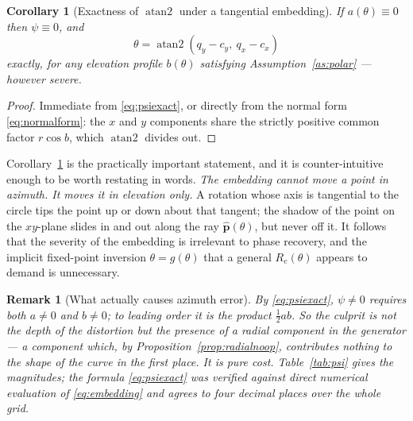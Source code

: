 \documentclass[11pt,a4paper]{article}
\newtheorem{corollary}[proposition]{Corollary}
\newtheorem{remark}{Remark}
\newcommand{\Rot}{R}
\newcommand{\phat}{\hat{\bm{p}}}
\begin{document}
\begin{corollary}[Exactness of $\operatorname{atan2}$ under a tangential embedding]
\label{cor:exact}
If $a(\theta)\equiv 0$ then $\psi \equiv 0$, and
\begin{equation}
\theta = \operatorname{atan2}(q_y - c_y,\ q_x - c_x)
\end{equation}
\emph{exactly}, for any elevation profile $b(\theta)$ satisfying
Assumption~\ref{as:polar} --- however severe.
\end{corollary}
\begin{proof}
Immediate from \eqref{eq:psiexact}, or directly from the normal form
\eqref{eq:normalform}: the $x$ and $y$ components share the strictly positive
common factor $r\cos b$, which $\operatorname{atan2}$ divides out.
\end{proof}

Corollary~\ref{cor:exact} is the practically important statement, and it is
counter-intuitive enough to be worth restating in words. \emph{The embedding
cannot move a point in azimuth. It moves it in elevation only.} A rotation whose
axis is tangential to the circle tips the point up or down about that tangent;
the shadow of the point on the $xy$-plane slides in and out along the ray
$\phat(\theta)$, but never off it. It follows that the severity of the
embedding is irrelevant to phase recovery, and the implicit fixed-point
inversion $\theta = g(\theta)$ that a general $\Rot_e(\theta)$ appears to demand
is unnecessary.

\begin{remark}[What actually causes azimuth error]
\label{rem:cause}
By \eqref{eq:psiexact}, $\psi \ne 0$ requires \emph{both} $a\ne0$ and $b\ne0$;
to leading order it is the \emph{product} $\tfrac12 ab$. So the culprit is not
the depth of the distortion but the presence of a radial component in the
generator --- a component which, by Proposition~\ref{prop:radialnoop},
contributes nothing to the shape of the curve in the first place. It is pure
cost. Table~\ref{tab:psi} gives the magnitudes; the formula
\eqref{eq:psiexact} was verified against direct numerical evaluation of
\eqref{eq:embedding} and agrees to four decimal places over the whole grid.
\end{remark}
\end{document}
